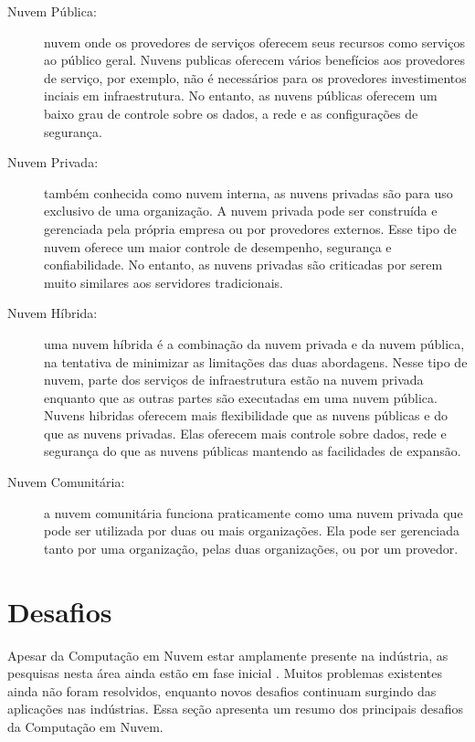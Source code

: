 	\begin{description}
	
		\item[Nuvem Pública:] nuvem onde os provedores de serviços oferecem seus recursos como serviços ao público geral. Nuvens publicas oferecem vários benefícios aos provedores de serviço, por exemplo, não é necessários para os provedores investimentos inciais em infraestrutura. No entanto, as nuvens públicas oferecem um baixo grau de controle sobre os dados, a rede e as configurações de segurança.  	 
			
		\item[Nuvem Privada:] também conhecida como nuvem interna, as nuvens privadas são para uso exclusivo de uma organização. A nuvem privada pode ser construída e gerenciada pela própria empresa ou por provedores externos. Esse tipo de nuvem oferece um maior controle de desempenho, segurança e confiabilidade. No entanto, as nuvens privadas são criticadas por serem muito similares aos servidores tradicionais.
		
		\item[Nuvem Híbrida:] uma nuvem híbrida é a combinação da nuvem privada e da nuvem pública, na tentativa de minimizar as limitações das duas abordagens. Nesse tipo de nuvem, parte dos serviços de infraestrutura estão na nuvem privada enquanto que as outras partes são executadas em uma nuvem pública. Nuvens hibridas oferecem mais flexibilidade que as nuvens públicas e do que as nuvens privadas. Elas oferecem mais controle sobre dados, rede e segurança do que as nuvens públicas mantendo as facilidades de expansão.
		
		\item[Nuvem Comunitária:] a nuvem comunitária funciona praticamente como uma nuvem privada que pode ser utilizada por duas ou mais organizações. Ela pode ser gerenciada tanto por uma organização, pelas duas organizações, ou por um provedor.
		 	
	\end{description}
	
\section{Desafios} \label{cloud:chal}

	Apesar da Computação em Nuvem estar amplamente presente na indústria, as pesquisas nesta área ainda estão em fase inicial \cite{stateOfArt:2010}.  Muitos problemas existentes ainda não foram resolvidos, enquanto novos desafios continuam surgindo das aplicações nas indústrias. Essa seção apresenta um resumo dos principais desafios da Computação em Nuvem. 
	
